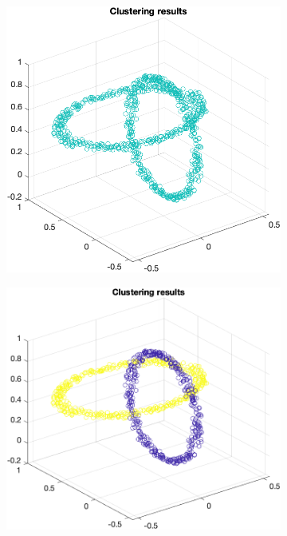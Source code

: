 \documentclass[a4paper, 11pt, one column]{article}
\begin{document}
\begin{figure}[]
    \centering
        \begin{subfigure}{0.33\textwidth}
            \includegraphics[width=\linewidth]{images/1.png}
        \end{subfigure}\hfil
        \begin{subfigure}{0.33\textwidth}
            \includegraphics[width=\linewidth]{images/4.png}

\end{subfigure}
\end{figure}
\end{document}
